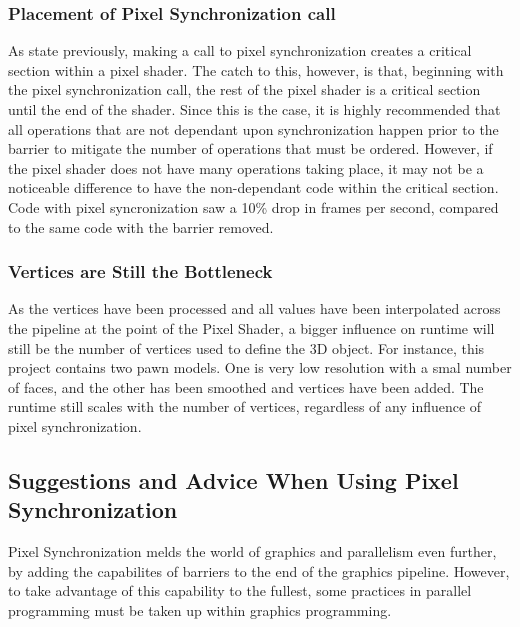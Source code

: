\documentclass[a4paper, 12pt]{article}
\begin{document}
\subsubsection{Placement of Pixel Synchronization call}

As state previously, making a call to pixel synchronization creates a critical
section within a pixel shader. The catch to this, however, is that, beginning
with the pixel synchronization call, the rest of the pixel shader is a
critical section until the end of the shader. Since this is the case, it is
highly recommended that all operations that are not dependant upon
synchronization happen prior to the barrier to mitigate the number of
operations that must be ordered. However, if the pixel shader does not have
many operations taking place, it may not be a noticeable difference to have
the non-dependant code within the critical section. Code with pixel
syncronization saw a 10\% drop in frames per second, compared to the same code
with the barrier removed.

\subsubsection{Vertices are Still the Bottleneck}

As the vertices have been processed and all values have been interpolated
across the pipeline at the point of the Pixel Shader, a bigger influence on
runtime will still be the number of vertices used to define the 3D object. For
instance, this project contains two pawn models. One is very low resolution
with a smal number of faces, and the other has been smoothed and vertices have
been added. The runtime still scales with the number of vertices, regardless
of any influence of pixel synchronization.

\subsection{Suggestions and Advice When Using Pixel Synchronization}
\label{section:suggestions}

Pixel Synchronization melds the world of graphics and parallelism even
further, by adding the capabilites of barriers to the end of the graphics
pipeline. However, to take advantage of this capability to the fullest, some
practices in parallel programming must be taken up within graphics
programming.
\end{document}
